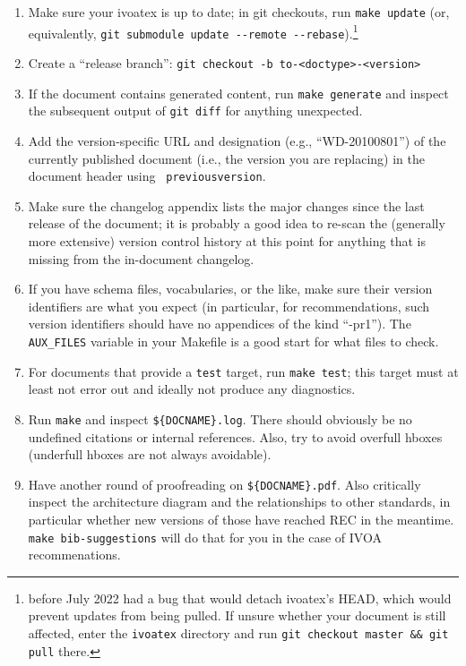 \documentclass[11pt,a4paper]{ivoa}
\newcommand{\texword}[1]{\texttt{\color{texcolor} #1}}
\begin{document}
\begin{enumerate}
\item Make sure your ivoatex is up to date; in git checkouts, run
\verb|make update| (or, equivalently,
\verb|git submodule update --remote --rebase|).\footnote{\ivoatex{} before
July 2022 had a bug that would detach ivoatex's HEAD, which would
prevent \ivoatex{} updates from being pulled.  If unsure whether your
document is still affected, enter the \texttt{ivoatex} directory and run
\texttt{git checkout master \&\& git pull} there.}

\item Create a ``release branch'':
\verb|git checkout -b to-<doctype>-<version>|

\item If the document contains generated content, run
\verb|make generate|
and inspect the subsequent output of
\verb|git diff|
for anything unexpected.

\item Add the version-specific URL and designation (e.g.,
``WD-20100801'') of the currently
published document (i.e., the version you are replacing) in the document
header using \texword{previousversion}.

\item Make sure the changelog appendix lists the major changes since the
last release of the document; it is probably a good idea to re-scan the
(generally more extensive) version control history at this point for
anything that is missing from the in-document changelog.

\item If you have schema files, vocabularies, or the like, make sure
their version identifiers are what you expect (in particular, for
recommendations, such version identifiers should have no appendices
of the kind ``-pr1'').  The \verb|AUX_FILES| variable in your Makefile is
a good start for what files to check.

\item For documents that provide a \verb|test| target, run
\verb|make test|;
this target must at least not error out and ideally not produce
any diagnostics.

\item Run \verb|make| and inspect \verb|${DOCNAME}.log|.  There should
obviously be no undefined citations or internal references.  Also, try
to avoid overfull hboxes (underfull hboxes are not always avoidable).

\item Have another round of proofreading on \verb|${DOCNAME}.pdf|.  Also
critically inspect the architecture diagram and the relationships to
other standards, in particular whether new versions of those have
reached REC in the meantime. \verb|make bib-suggestions| will do
that for you in the case of IVOA recommenations.


\end{enumerate}
\end{document}
